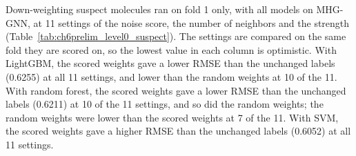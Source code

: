 Down-weighting suspect molecules ran on fold 1 only, with all models on MHG-GNN, at 11 settings of the noise score, the number of neighbors and the strength (Table~\ref{tab:ch6prelim_level0_suspect}). The settings are compared on the same fold they are scored on, so the lowest value in each column is optimistic. With LightGBM, the scored weights gave a lower RMSE than the unchanged labels (0.6255) at all 11 settings, and lower than the random weights at 10 of the 11. With random forest, the scored weights gave a lower RMSE than the unchanged labels (0.6211) at 10 of the 11 settings, and so did the random weights; the random weights were lower than the scored weights at 7 of the 11. With SVM, the scored weights gave a higher RMSE than the unchanged labels (0.6052) at all 11 settings.

